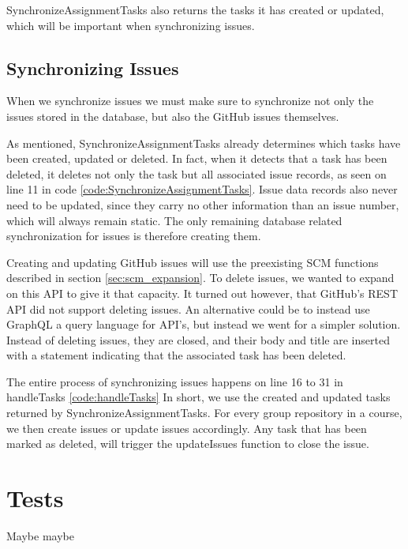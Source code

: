 

SynchronizeAssignmentTasks also returns the tasks it has created or updated, which will be important when synchronizing issues.

\subsection{Synchronizing Issues}

When we synchronize issues we must make sure to synchronize not only the issues stored in the database, but also the GitHub issues themselves.

As mentioned, SynchronizeAssignmentTasks already determines which tasks have been created, updated or deleted.
In fact, when it detects that a task has been deleted, it deletes not only the task but all associated issue records, as seen on line 11 in code \ref{code:SynchronizeAssignmentTasks}.
Issue data records also never need to be updated, since they carry no other information than an issue number, which will always remain static.
The only remaining database related synchronization for issues is therefore creating them.

Creating and updating GitHub issues will use the preexisting SCM functions described in section \ref{sec:scm_expansion}.
To delete issues, we wanted to expand on this API to give it that capacity.
It turned out however, that GitHub's REST API did not support deleting issues.
An alternative could be to instead use GraphQL a query language for API's, but instead we went for a simpler solution.
Instead of deleting issues, they are closed, and their body and title are inserted with a statement indicating that the associated task has been deleted.

The entire process of synchronizing issues happens on line 16 to 31 in handleTasks \ref{code:handleTasks}
In short, we use the created and updated tasks returned by SynchronizeAssignmentTasks.
For every group repository in a course, we then create issues or update issues accordingly.
Any task that has been marked as deleted, will trigger the updateIssues function to close the issue.

\section{Tests}

Maybe maybe
